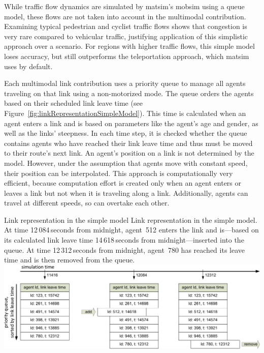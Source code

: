 While traffic flow dynamics are simulated by \gls{matsim}'s \gls{mobsim} using a queue model, these flows are not taken into account in the \gls{multimodal} contribution. Examining typical pedestrian and cyclist traffic flows shows that congestion is very rare compared to vehicular traffic, justifying application of this simplistic approach over a scenario. For regions with higher traffic flows, this simple model loses accuracy, but still outperforms the \gls{teleportation} approach, which \gls{matsim} uses by default.

Each \gls{multimodal} link contribution uses a priority queue to manage all agents traveling on that link using a non-motorized mode. The queue orders the agents based on their scheduled link leave time (see Figure~\ref{fig:linkRepresentationSimpleModel}). This time is calculated when an agent enters a link and is based on parameters like the agent's age and gender, as well as the links' steepness. In each time step, it is checked whether the queue contains agents who have reached their link leave time and thus must be moved to their route's next link. An agent's position on a link is not determined by the model. However, under the assumption that agents move with constant speed, their position can be interpolated. This approach is computationally very efficient, because computation effort is created only when an agent enters or leaves a link but not when it is traveling along a link. Additionally, agents can travel at different speeds, so can overtake each other.

\createfigure%
{Link representation in the simple model}%
{Link representation in the simple model. \\At time 12\,084\,seconds from midnight, agent~512 enters the link and is---based on its calculated link leave time 14\,618\,seconds from midnight---inserted into the queue. At time 12\,312\,seconds from midnight, agent~780 has reached its leave time and is then removed from the queue.}%
{\label{fig:linkRepresentationSimpleModel}}%
{\includegraphics[width=1.0\textwidth, angle=0]{extending/figures/MultiModalSimulation/linkRepresentation}}%
{}

